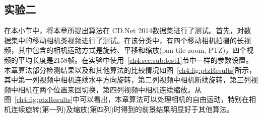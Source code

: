 \subsection{实验二}
\label{ch4:sec:sub:test2}
在本小节中，将本章所提出算法在 CD.Net 2014数据集\cite{CD2014}进行了测试。首先，对数据集中的移动相机类视频进行了测试。在该分类中，有四个移动相机拍摄的长视频，其中包含的相机运动方式是旋转、平移和缩放(pan-tile-zoom, PTZ)，四个视频的平均长度是2158帧。在实验中使用~\ref{ch4:sec:sub:test1}节中一样的参数设置。本章算法部分检测结果以及和其他算法的比较情况如图~\ref{ch4:fig:ptzResults}所示，其中第一列视频中相机连续水平方向旋转，第二列视频中相机断续旋转，第三列视频中相机在两个位置来回切换，第四列视频中相机连续缩放。从图~\ref{ch4:fig:ptzResults}中可以看出，本章算法可以处理相机的自由运动，特别在相机连续旋转(第一列)及缩放(第四列)时得到的前景结果明显好于其他算法。\par

